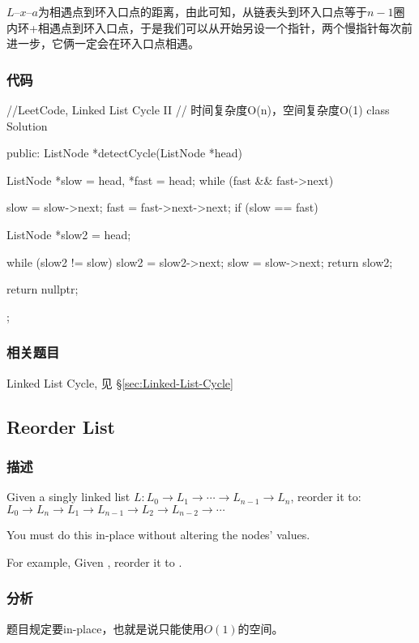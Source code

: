 $L – x – 
a$为相遇点到环入口点的距离，由此可知，从链表头到环入口点等于$n-1$圈内环+相遇点到环入口点，于是我们可以从开始另设一个指针，两个慢指针每次前进一步，它俩一定会在环入口点相遇。

\subsubsection{代码}
\begin{Code}
	//LeetCode, Linked List Cycle II
	// 时间复杂度O(n)，空间复杂度O(1)
	class Solution {
		public:
		ListNode *detectCycle(ListNode *head) {
			ListNode *slow = head, *fast = head;
			while (fast && fast->next) {
				slow = slow->next;
				fast = fast->next->next;
				if (slow == fast) {
					ListNode *slow2 = head;
					
					while (slow2 != slow) {
						slow2 = slow2->next;
						slow = slow->next;
					}
					return slow2;
				}
			}
			return nullptr;
		}
	};
\end{Code}


\subsubsection{相关题目}
\begindot
\item Linked List Cycle, 见 \S \ref{sec:Linked-List-Cycle}
\myenddot


\subsection{Reorder List}
\label{sec:Reorder-List}


\subsubsection{描述}
Given a singly linked list $L: L_0 \rightarrow L_1 \rightarrow \cdots 
\rightarrow L_{n-1} \rightarrow L_n$,
reorder it to: $L_0 \rightarrow L_n \rightarrow L_1 \rightarrow L_{n-1} 
\rightarrow L_2 \rightarrow L_{n-2} \rightarrow \cdots$

You must do this in-place without altering the nodes' values.

For example,
Given , reorder it to .


\subsubsection{分析}
题目规定要in-place，也就是说只能使用$O(1)$的空间。

